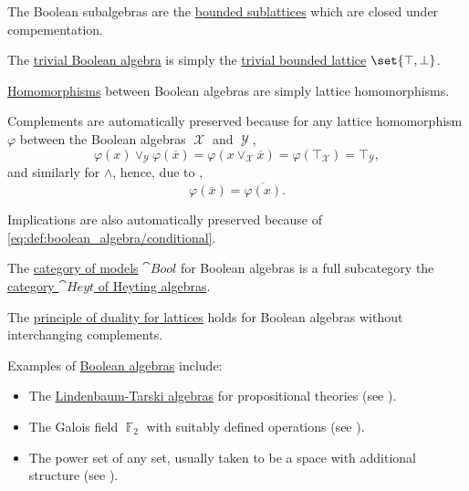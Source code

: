 \begin{definition}
\begin{thmenum}[resume=def:boolean_algebra]
     The Boolean subalgebras are the \hyperref[def:semilattice/submodel]{bounded sublattices} which are closed under compementation.

     The \hyperref[thm:substructures_form_complete_lattice/bottom]{trivial Boolean algebra} is simply the \hyperref[def:semilattice/trivial]{trivial bounded lattice} \( \set{ \top, \bot } \).

     \hyperref[def:first_order_homomorphism]{Homomorphisms} between Boolean algebras are simply lattice homomorphisms.

    Complements are automatically preserved because for any lattice homomorphism \( \varphi \) between the Boolean algebras \( \mscrX \) and \( \mscrY \),
    \begin{equation*}
      \varphi(x) \vee_\mscrY \varphi(\overline x) = \varphi(x \vee_\mscrX \overline x) = \varphi(\top_\mscrX) = \top_\mscrY,
    \end{equation*}
    and similarly for \( \wedge \), hence, due to ,
    \begin{equation*}
      \varphi(\overline x) = \overline {\varphi(x)}.
    \end{equation*}

    Implications are also automatically preserved because of \eqref{eq:def:boolean_algebra/conditional}.

     The \hyperref[def:category_of_first_order_models]{category of models} \( \cat{Bool} \) for Boolean algebras is a full subcategory the \hyperref[def:heyting_algebra/category]{category \( \cat{Heyt} \) of Heyting algebras}.

     The \hyperref[def:semilattice/lattice_duality]{principle of duality for lattices} holds for Boolean algebras without interchanging complements.
  \end{thmenum}
\end{definition}

\begin{example}\label{ex:boolean_algebras}
  Examples of \hyperref[def:boolean_algebra]{Boolean algebras} include:

  \begin{itemize}
    \item The \hyperref[def:lindenbaum_tarski_algebra]{Lindenbaum-Tarski algebras} for propositional theories (see ).
    \item The Galois field \( \BbbF_2 \) with suitably defined operations (see ).
    \item The power set of any set, usually taken to be a space with additional structure (see ).
  \end{itemize}
\end{example}


